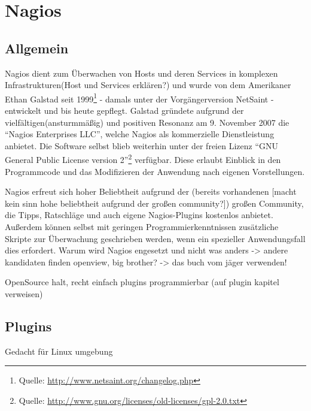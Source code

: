 \section{Nagios}

\subsection{Allgemein}
Nagios dient zum Überwachen von Hosts und deren Services in komplexen Infrastrukturen(Host und Services erklären?) und wurde von dem Amerikaner Ethan Galstad seit 1999\footnote{Quelle: \url{http://www.netsaint.org/changelog.php}} - damals unter der Vorgängerversion NetSaint - entwickelt und bis heute gepflegt.
Galstad gründete aufgrund der vielfältigen(ansturmmäßig) und positiven Resonanz am 9. November 2007 die "`Nagios Enterprises LLC"', welche Nagios als kommerzielle Dienstleistung anbietet.
Die Software selbst blieb weiterhin unter der freien Lizenz "`GNU General Public License version 2"'\footnote{Quelle: \url{http://www.gnu.org/licenses/old-licenses/gpl-2.0.txt}} verfügbar.
Diese erlaubt Einblick in den Programmcode und das Modifizieren der Anwendung nach eigenen Vorstellungen.

Nagios erfreut sich hoher Beliebtheit aufgrund der (bereits vorhandenen [macht kein sinn hohe beliebtheit aufgrund der großen community?]) großen Community, die Tipps, Ratschläge und auch eigene Nagios-Plugins kostenlos anbietet.
Außerdem können selbst mit geringen Programmierkenntnissen zusätzliche Skripte zur Überwachung geschrieben werden, wenn ein spezieller Anwendungsfall dies erfordert.
Warum wird Nagios engesetzt und nicht was anders -> andere kandidaten finden openview, big brother? -> das buch vom jäger verwenden!

OpenSource halt, recht einfach plugins programmierbar (auf plugin kapitel verweisen)





\subsection{Plugins}
Gedacht für Linux umgebung

